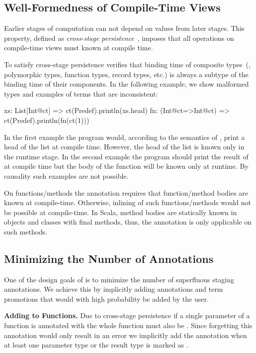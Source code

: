 \subsection{Well-Formedness of Compile-Time Views}
\label{sct:wf-ctv}

Earlier stages of computation can not depend on values from later stages. This property,
 defined as \emph{cross-stage persistence}~\cite{taha_multi-stage_1997,westbrook2010mint},
 imposes that all operations on compile-time views must known at compile time.

To satisfy cross-stage persistence \tool verifies that binding time of composite
 types~(\eg, polymorphic types, function types, record types, etc.) is always
 a subtype of the binding time of their components. In the following example,
 we show malformed types and examples of terms that are inconsistent:\begin{lstparagraph}
xs: List[Int@ct]     => ct(Predef).println(xs.head)
fn: (Int@ct=>Int@ct) => ct(Predef).println(fn(ct(1)))
\end{lstparagraph}

In the first example the program would, according to the semantics of , print a head of the list at compile time.
 However, the head of the list is known only in the runtime stage. In the second example the program should
 print the result of  at compile time but the body of the function will
 be known only at runtime. By causality such examples are not possible.

On functions/methods the  annotation requires that function/method bodies are known at compile-time.
 Otherwise, inlining of such functions/methods would not be possible at compile-time. In Scala,
 method bodies are statically known in objects and classes with final methods, thus, the 
 annotation is only applicable on such methods.

\subsection{Minimizing the Number of Annotations}
\label{sct:implicits}

One of the design goals of \tool is to minimize the number of superfluous staging annotations. We achieve
 this by implicitly adding annotations and term promotions that would with high probability be added by the user.


{\bf Adding  to Functions.} Due to cross-stage persistence if a single parameter of
a function is annotated with  the whole function must also be . Since forgetting
this annotation would only result in an error we implicitly add
the  annotation when at least one parameter type or the result type is marked as .

